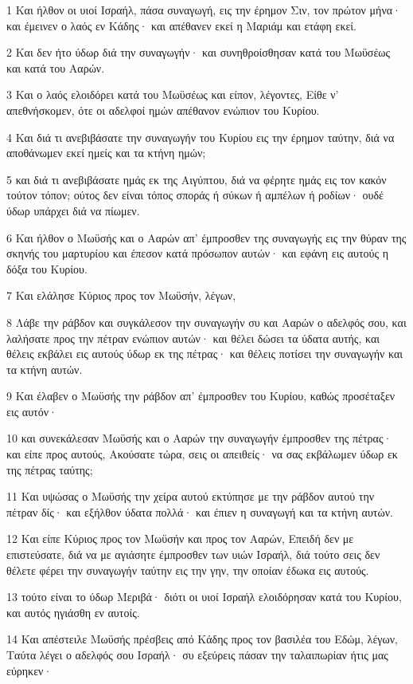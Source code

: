 \par 1 Και ήλθον οι υιοί Ισραήλ, πάσα συναγωγή, εις την έρημον Σιν, τον πρώτον μήνα· και έμεινεν ο λαός εν Κάδης· και απέθανεν εκεί η Μαριάμ και ετάφη εκεί.
\par 2 Και δεν ήτο ύδωρ διά την συναγωγήν· και συνηθροίσθησαν κατά του Μωϋσέως και κατά του Ααρών.
\par 3 Και ο λαός ελοιδόρει κατά του Μωϋσέως και είπον, λέγοντες, Είθε ν' απεθνήσκομεν, ότε οι αδελφοί ημών απέθανον ενώπιον του Κυρίου.
\par 4 Και διά τι ανεβιβάσατε την συναγωγήν του Κυρίου εις την έρημον ταύτην, διά να αποθάνωμεν εκεί ημείς και τα κτήνη ημών;
\par 5 και διά τι ανεβιβάσατε ημάς εκ της Αιγύπτου, διά να φέρητε ημάς εις τον κακόν τούτον τόπον; ούτος δεν είναι τόπος σποράς ή σύκων ή αμπέλων ή ροδίων· ουδέ ύδωρ υπάρχει διά να πίωμεν.
\par 6 Και ήλθον ο Μωϋσής και ο Ααρών απ' έμπροσθεν της συναγωγής εις την θύραν της σκηνής του μαρτυρίου και έπεσον κατά πρόσωπον αυτών· και εφάνη εις αυτούς η δόξα του Κυρίου.
\par 7 Και ελάλησε Κύριος προς τον Μωϋσήν, λέγων,
\par 8 Λάβε την ράβδον και συγκάλεσον την συναγωγήν συ και Ααρών ο αδελφός σου, και λαλήσατε προς την πέτραν ενώπιον αυτών· και θέλει δώσει τα ύδατα αυτής, και θέλεις εκβάλει εις αυτούς ύδωρ εκ της πέτρας· και θέλεις ποτίσει την συναγωγήν και τα κτήνη αυτών.
\par 9 Και έλαβεν ο Μωϋσής την ράβδον απ' έμπροσθεν του Κυρίου, καθώς προσέταξεν εις αυτόν·
\par 10 και συνεκάλεσαν Μωϋσής και ο Ααρών την συναγωγήν έμπροσθεν της πέτρας· και είπε προς αυτούς, Ακούσατε τώρα, σεις οι απειθείς· να σας εκβάλωμεν ύδωρ εκ της πέτρας ταύτης;
\par 11 Και υψώσας ο Μωϋσής την χείρα αυτού εκτύπησε με την ράβδον αυτού την πέτραν δίς· και εξήλθον ύδατα πολλά· και έπιεν η συναγωγή και τα κτήνη αυτών.
\par 12 Και είπε Κύριος προς τον Μωϋσήν και προς τον Ααρών, Επειδή δεν με επιστεύσατε, διά να με αγιάσητε έμπροσθεν των υιών Ισραήλ, διά τούτο σεις δεν θέλετε φέρει την συναγωγήν ταύτην εις την γην, την οποίαν έδωκα εις αυτούς.
\par 13 τούτο είναι το ύδωρ Μεριβά· διότι οι υιοί Ισραήλ ελοιδόρησαν κατά του Κυρίου, και αυτός ηγιάσθη εν αυτοίς.
\par 14 Και απέστειλε Μωϋσής πρέσβεις από Κάδης προς τον βασιλέα του Εδώμ, λέγων, Ταύτα λέγει ο αδελφός σου Ισραήλ· συ εξεύρεις πάσαν την ταλαιπωρίαν ήτις μας εύρηκεν·
